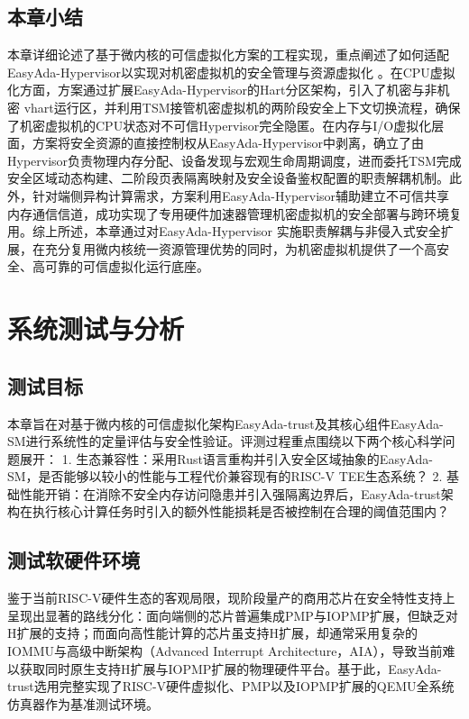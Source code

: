 \documentclass[master, vlined, review]{DissertUESTC}
\begin{document}
	\section{本章小结}
	本章详细论述了基于微内核的可信虚拟化方案的工程实现，重点阐述了如何适配EasyAda-Hypervisor以实现对机密虚拟机的安全管理与资源虚拟化 。在CPU虚拟化方面，方案通过扩展EasyAda-Hypervisor的Hart分区架构，引入了机密与非机密 vhart运行区，并利用TSM接管机密虚拟机的两阶段安全上下文切换流程，确保了机密虚拟机的CPU状态对不可信Hypervisor完全隐匿。在内存与I/O虚拟化层面，方案将安全资源的直接控制权从EasyAda-Hypervisor中剥离，确立了由Hypervisor负责物理内存分配、设备发现与宏观生命周期调度，进而委托TSM完成安全区域动态构建、二阶段页表隔离映射及安全设备鉴权配置的职责解耦机制。此外，针对端侧异构计算需求，方案利用EasyAda-Hypervisor辅助建立不可信共享内存通信信道，成功实现了专用硬件加速器管理机密虚拟机的安全部署与跨环境复用。综上所述，本章通过对EasyAda-Hypervisor 实施职责解耦与非侵入式安全扩展，在充分复用微内核统一资源管理优势的同时，为机密虚拟机提供了一个高安全、高可靠的可信虚拟化运行底座。
	
	\chapter{系统测试与分析}
	\section{测试目标}
	本章旨在对基于微内核的可信虚拟化架构EasyAda-trust及其核心组件EasyAda-SM进行系统性的定量评估与安全性验证。评测过程重点围绕以下两个核心科学问题展开：
	1. 生态兼容性：采用Rust语言重构并引入安全区域抽象的EasyAda-SM，是否能够以较小的性能与工程代价兼容现有的RISC-V TEE生态系统？
	2. 基础性能开销：在消除不安全内存访问隐患并引入强隔离边界后，EasyAda-trust架构在执行核心计算任务时引入的额外性能损耗是否被控制在合理的阈值范围内？

	
	\section{测试软硬件环境}
	
	鉴于当前RISC-V硬件生态的客观局限，现阶段量产的商用芯片在安全特性支持上呈现出显著的路线分化：面向端侧的芯片普遍集成PMP与IOPMP扩展，但缺乏对H扩展的支持；而面向高性能计算的芯片虽支持H扩展，却通常采用复杂的IOMMU与高级中断架构（Advanced Interrupt Architecture，AIA），导致当前难以获取同时原生支持H扩展与IOPMP扩展的物理硬件平台。基于此，EasyAda-trust选用完整实现了RISC-V硬件虚拟化、PMP以及IOPMP扩展的QEMU全系统仿真器作为基准测试环境。
	
\end{document}
